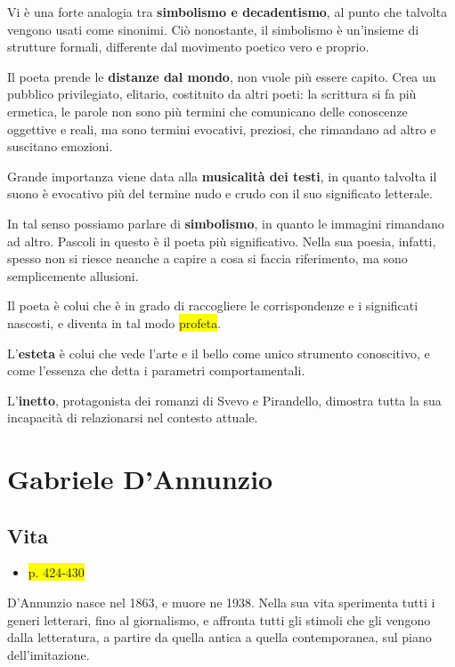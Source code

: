 \documentclass{book}
\newcommand{\pagine}[1]{\colorbox{yellow}{#1}}
\newcommand{\evidenziatore}[1]{\textbf{#1}}
\begin{document}
Vi è una forte analogia tra
\evidenziatore{\textbf{simbolismo} e \textbf{decadentismo}}, al punto che talvolta
vengono usati come sinonimi. Ciò nonostante, il simbolismo è un'insieme
di strutture formali, differente dal movimento poetico vero e proprio.

Il poeta prende le \evidenziatore{distanze dal mondo}, non vuole più
essere capito. Crea un pubblico privilegiato, elitario, costituito da
altri poeti: la scrittura si fa più ermetica, le parole non sono più
termini che comunicano delle conoscenze oggettive e reali, ma sono
termini evocativi, preziosi, che rimandano ad altro e suscitano
emozioni.

Grande importanza viene data alla \evidenziatore{musicalità dei testi},
in quanto talvolta il suono è evocativo più del termine nudo e crudo con
il suo significato letterale.

In tal senso possiamo parlare di \evidenziatore{simbolismo}, in quanto
le immagini rimandano ad altro. Pascoli in questo è il poeta più
significativo. Nella sua poesia, infatti, spesso non si riesce neanche a
capire a cosa si faccia riferimento, ma sono semplicemente allusioni.

Il poeta è colui che è in grado di raccogliere le corrispondenze e i
significati nascosti, e diventa in tal modo \pagine{profeta}.

L'\evidenziatore{esteta} è colui che vede l'arte e il bello come unico
strumento conoscitivo, e come l'essenza che detta i parametri
comportamentali.

L'\evidenziatore{inetto}, protagonista dei romanzi di Svevo e
Pirandello, dimostra tutta la sua incapacità di relazionarsi nel
contesto attuale.

\chapter{Gabriele D’Annunzio}

\section{Vita}

\begin{itemize}
\item
  \pagine{p. 424-430}
\end{itemize}

D'Annunzio nasce nel 1863, e muore ne 1938. Nella sua vita sperimenta
tutti i generi letterari, fino al giornalismo, e affronta tutti gli
stimoli che gli vengono dalla letteratura, a partire da quella antica a
quella contemporanea, sul piano dell'imitazione.
\end{document}

